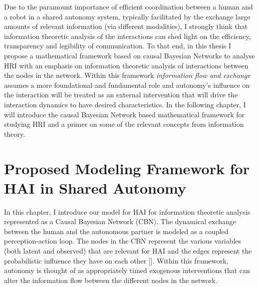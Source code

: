 \documentclass[12pt]{article}
\newcommand{\DGc}[1]{{\textbf{\color{blue}{#1}}}}
\begin{document}
Due to the paramount importance of efficient coordination between a human and a robot in a shared autonomy system, typically facilitated by the exchange large amounts of relevant information (via different modalities), I strongly think that information theoretic analysis of the interactions can shed light on the efficiency, transparency and legibility of communication. To that end, in this thesis I propose a mathematical framework based on causal Bayesian Networks to analyse HRI 
with an emphasis on information theoretic analysis of interactions between the nodes in the network. Within this framework \textit{information flow and exchange} assumes a more foundational and fundamental role and autonomy's influence on the interaction will be treated as an external intervention that will drive the interaction dynamics to have desired characteristics. In the following chapter, I will introduce the causal Bayesian Network based mathematical framework for studying HRI and a primer on some of the relevant concepts from information theory. 

% 
%
%
%

%
%
%
%

\pagebreak
\section{Proposed Modeling Framework for HAI in Shared Autonomy}
In this chapter, I introduce our model for HAI for information theoretic analysis represented as a Causal Bayesian Network (CBN). The dynamical exchange between the human and the autonomous partner is modeled as a coupled perception-action loop. The nodes in the CBN represent the various variables (both latent and observed) that are relevant for HAI and the edges represent the probabilistic influence they have on each other []. Within this framework, autonomy is thought of as appropriately timed exogenous interventions that can alter the information flow between the different nodes in the network.
\end{document}
